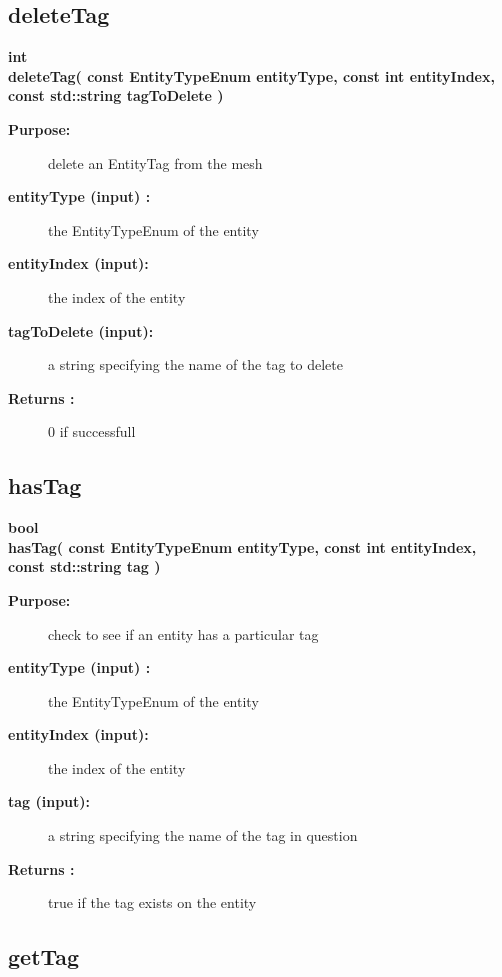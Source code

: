 \subsection{deleteTag}
 
\begin{flushleft} \textbf{%
int  \\ 
\settowidth{\UnstructuredMappingIncludeArgIndent}{deleteTag(}%
deleteTag( const  EntityTypeEnum entityType, const int entityIndex, \\ 
\hspace{\UnstructuredMappingIncludeArgIndent}const std::string tagToDelete )
}\end{flushleft}
\begin{description}
\item[{\bf Purpose:}]  
    delete an EntityTag from the mesh
\item[{\bf entityType (input) :}]  the EntityTypeEnum of the entity
\item[{\bf entityIndex (input):}]  the index of the entity
\item[{\bf tagToDelete    (input):}]  a string specifying the name of the tag to delete
\item[{\bf Returns :}]  0 if successfull
\end{description}
\subsection{hasTag}
 
\begin{flushleft} \textbf{%
bool  \\ 
\settowidth{\UnstructuredMappingIncludeArgIndent}{hasTag(}%
hasTag( const  EntityTypeEnum entityType, const int entityIndex, const std::string tag )
}\end{flushleft}
\begin{description}
\item[{\bf Purpose:}]  
    check to see if an entity has a particular tag
\item[{\bf entityType (input) :}]  the EntityTypeEnum of the entity
\item[{\bf entityIndex (input):}]  the index of the entity
\item[{\bf tag    (input):}]  a string specifying the name of the tag in question
\item[{\bf Returns :}]  true if the tag exists on the entity
\end{description}
\subsection{getTag}
 
